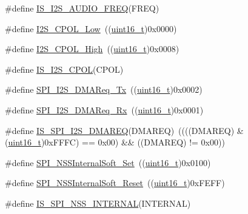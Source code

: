 \begin{DoxyCompactItemize}
\#define \hyperlink{group___i2_s___audio___frequency_gaf39d917f4a38fd9916ec347fb055391c}{I\+S\+\_\+\+I2\+S\+\_\+\+A\+U\+D\+I\+O\+\_\+\+F\+R\+EQ}(F\+R\+EQ)
\item 
\#define \hyperlink{group___i2_s___clock___polarity_gae859a63575e4af3e007fc5123fa901ab}{I2\+S\+\_\+\+C\+P\+O\+L\+\_\+\+Low}~((\hyperlink{_p_e___types_8h_a1f1825b69244eb3ad2c7165ddc99c956}{uint16\+\_\+t})0x0000)
\item 
\#define \hyperlink{group___i2_s___clock___polarity_gae26f7f9fbde299fbdc0b81a2cc38bfdb}{I2\+S\+\_\+\+C\+P\+O\+L\+\_\+\+High}~((\hyperlink{_p_e___types_8h_a1f1825b69244eb3ad2c7165ddc99c956}{uint16\+\_\+t})0x0008)
\item 
\#define \hyperlink{group___i2_s___clock___polarity_ga6323375bf0b6fa6e2ee2a9ce6f9ef82f}{I\+S\+\_\+\+I2\+S\+\_\+\+C\+P\+OL}(C\+P\+OL)
\item 
\#define \hyperlink{group___s_p_i___i2_s___d_m_a__transfer__requests_ga05f55a18c83aaa945d99200d012e5e2a}{S\+P\+I\+\_\+\+I2\+S\+\_\+\+D\+M\+A\+Req\+\_\+\+Tx}~((\hyperlink{_p_e___types_8h_a1f1825b69244eb3ad2c7165ddc99c956}{uint16\+\_\+t})0x0002)
\item 
\#define \hyperlink{group___s_p_i___i2_s___d_m_a__transfer__requests_gaa7f680295cdc1af9b086bf51312f15f3}{S\+P\+I\+\_\+\+I2\+S\+\_\+\+D\+M\+A\+Req\+\_\+\+Rx}~((\hyperlink{_p_e___types_8h_a1f1825b69244eb3ad2c7165ddc99c956}{uint16\+\_\+t})0x0001)
\item 
\#define \hyperlink{group___s_p_i___i2_s___d_m_a__transfer__requests_ga6a8f97093494f2331dbdf9295d7c2c6b}{I\+S\+\_\+\+S\+P\+I\+\_\+\+I2\+S\+\_\+\+D\+M\+A\+R\+EQ}(D\+M\+A\+R\+EQ)~((((D\+M\+A\+R\+EQ) \& (\hyperlink{_p_e___types_8h_a1f1825b69244eb3ad2c7165ddc99c956}{uint16\+\_\+t})0x\+F\+F\+F\+C) == 0x00) \&\& ((\+D\+M\+A\+R\+E\+Q) != 0x00))
\item 
\#define \hyperlink{group___s_p_i___n_s_s__internal__software__management_ga6b2102816167d12140648dba49a192a7}{S\+P\+I\+\_\+\+N\+S\+S\+Internal\+Soft\+\_\+\+Set}~((\hyperlink{_p_e___types_8h_a1f1825b69244eb3ad2c7165ddc99c956}{uint16\+\_\+t})0x0100)
\item 
\#define \hyperlink{group___s_p_i___n_s_s__internal__software__management_ga292ec7bc0cd362d61b3b5eed620522c2}{S\+P\+I\+\_\+\+N\+S\+S\+Internal\+Soft\+\_\+\+Reset}~((\hyperlink{_p_e___types_8h_a1f1825b69244eb3ad2c7165ddc99c956}{uint16\+\_\+t})0x\+F\+E\+F\+F)
\item 
\#define \hyperlink{group___s_p_i___n_s_s__internal__software__management_ga7036de442206fb8b365528c115345b36}{I\+S\+\_\+\+S\+P\+I\+\_\+\+N\+S\+S\+\_\+\+I\+N\+T\+E\+R\+N\+AL}(I\+N\+T\+E\+R\+N\+AL)

\end{DoxyCompactItemize}
